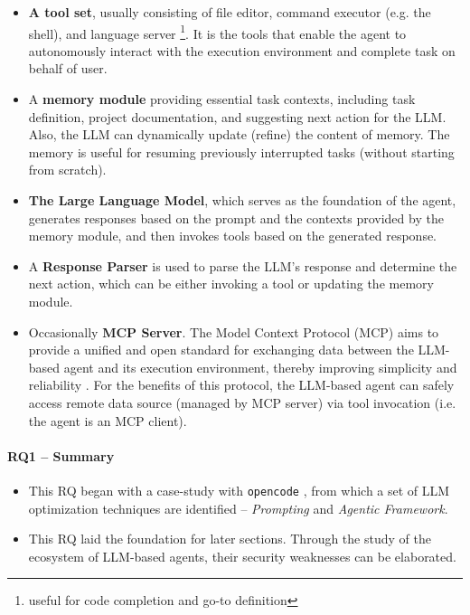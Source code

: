 \begin{itemize}
 \item \textbf{A tool set}, usually consisting of file editor, 
   command executor (e.g. the shell), 
   and language server \footnote{useful for code completion and go-to definition}.
  It is the tools that enable the agent to autonomously interact with
  the execution environment and complete task on behalf of user.

 \item A \textbf{memory module} providing essential task contexts,
  including task definition, project documentation, and 
  suggesting next action for the LLM.
  Also, the LLM can dynamically update (refine) the content of memory.
  The memory is useful for resuming previously interrupted tasks
  (without starting from scratch).

 \item \textbf{The Large Language Model}, which serves as the foundation 
  of the agent, generates responses based on the
  prompt and the contexts provided by the memory module, and then
  invokes tools based on the generated response.

 \item A \textbf{Response Parser} is used to parse the LLM's 
     response and determine the next action, which can be either 
     invoking a tool or updating the memory module.

 \item Occasionally \textbf{MCP Server}. The Model Context Protocol
 (MCP) aims to provide a unified and open standard for exchanging
 data between the LLM-based agent and its execution environment,
  thereby improving simplicity and reliability \citep{mcpintro}.
 For the benefits of this protocol, the LLM-based agent
  can safely access remote data source (managed by MCP server)
  via tool invocation (i.e. the agent is an MCP client).
 
\end{itemize}


\paragraph*{RQ1 -- Summary}

\begin{itemize}
  \item This RQ began with a case-study with \texttt{opencode}
  \citep{opencode}, from which a set of LLM optimization
  techniques are identified -- \textit{Prompting} and
  \textit{Agentic Framework}.

  \item This RQ laid the foundation for later sections.
  Through the study of the ecosystem of LLM-based
  agents, their security weaknesses can be elaborated.
\end{itemize}

